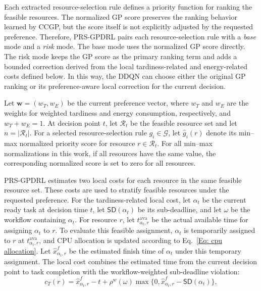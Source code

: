 \documentclass[10pt,journal]{IEEEtran}
\begin{document}
Each extracted resource-selection rule defines a priority function for ranking the feasible resources. The normalized GP score preserves the ranking behavior learned by CCGP, but the score itself is not explicitly adjusted by the requested preference. Therefore, PRS-GPDRL pairs each resource-selection rule with a \textit{base} mode and a \textit{risk} mode. The base mode uses the normalized GP score directly. The risk mode keeps the GP score as the primary ranking term and adds a bounded correction derived from the local tardiness-related and energy-related costs defined below. In this way, the DDQN can choose either the original GP ranking or its preference-aware local correction for the current decision.

Let $\mathbf{w}=(w_T,w_E)$ be the current preference vector, where $w_T$ and $w_E$ are the weights for weighted tardiness and energy consumption, respectively, and $w_T+w_E=1$. At decision point $t$, let $\mathcal{R}_t$ be the feasible resource set and let $n=|\mathcal{R}_t|$. For a selected resource-selection rule $g_i\in\mathcal{G}$, let $\hat{g}_i(r)$ denote its min--max normalized priority score for resource $r\in\mathcal{R}_t$. For all min--max normalizations in this work, if all resources have the same value, the corresponding normalized score is set to zero for all resources.

PRS-GPDRL estimates two local costs for each resource in the same feasible resource set. These costs are used to stratify feasible resources under the requested preference. For the tardiness-related local cost, let $\alpha_t$ be the current ready task at decision time $t$, let $\mathsf{SD}(\alpha_t)$ be its sub-deadline, and let $\omega$ be the workflow containing $\alpha_t$. For resource $r$, let $t_{\alpha_t,r}^{\mathrm{ava}}$ be the actual available time for assigning $\alpha_t$ to $r$. To evaluate this feasible assignment, $\alpha_t$ is temporarily assigned to $r$ at $t_{\alpha_t,r}^{\mathrm{ava}}$, and CPU allocation is updated according to Eq.~\eqref{Eq: cpu allocation}. Let $\hat{x}_{\alpha_t,r}^{f}$ be the estimated finish time of $\alpha_t$ under this temporary assignment. The local cost combines the estimated time from the current decision point to task completion with the workflow-weighted sub-deadline violation:
\begin{equation}
    c_T(r)=
    \hat{x}_{\alpha_t,r}^{f}-t
    + \rho^w(\omega)
    \max\{0,\hat{x}_{\alpha_t,r}^{f}-\mathsf{SD}(\alpha_t)\},
    \label{Eq: tardiness local cost}
\end{equation}
\end{document}
